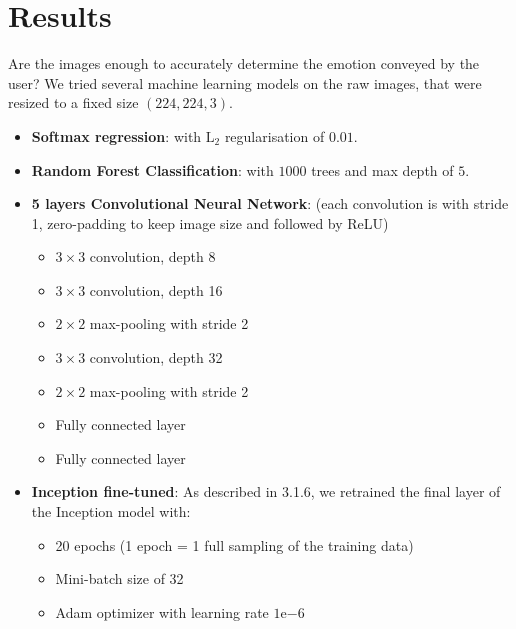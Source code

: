 \section{Results}
Are the images enough to accurately determine the emotion conveyed by the user? We tried several machine learning models on the raw images, that were resized to a fixed size $(224, 224, 3)$.
\begin{itemize}
    \item \textbf{Softmax regression}: with $\text{L}_2$ regularisation of $0.01$.
    \item \textbf{Random Forest Classification}: with $1000$ trees and max depth of $5$.
    \item \textbf{5 layers Convolutional Neural Network}: (each convolution is with stride 1, zero-padding to keep image size and followed by ReLU)
    \begin{itemize}[topsep=0pt]
        \itemsep-1em
        \item $3\times 3$ convolution, depth 8
        \item $3\times 3$ convolution, depth 16
        \item $2\times 2$ max-pooling with stride 2
        \item $3\times 3$ convolution, depth 32
        \item $2 \times 2$ max-pooling with stride 2
        \item Fully connected layer
        \item Fully connected layer
    \end{itemize}
    \item \textbf{Inception fine-tuned}: As described in 3.1.6, we retrained the final layer of the Inception model with:
    \begin{itemize}[topsep=0pt]
        \itemsep-1em
        \item 20 epochs (1 epoch = 1 full sampling of the training data)
        \item Mini-batch size of 32
        \item Adam optimizer with learning rate $1\mathrm{e}{-6}$
    \end{itemize}
\end{itemize}

